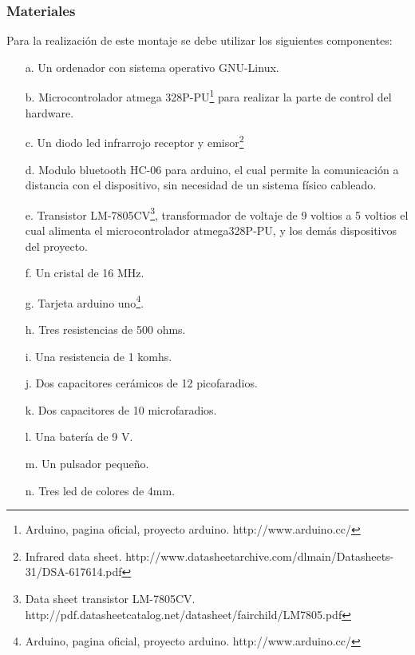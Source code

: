 \documentclass[12pt]{article}
\begin{document}
\begin{multicols}{2}
\subsubsection{Materiales}
Para la realización de este montaje se debe utilizar los siguientes componentes:
\begin{enumerate}
\item[a.] Un ordenador con sistema operativo GNU-Linux.
\item[b.] Microcontrolador atmega 328P-PU\footnote{ Arduino, pagina oficial, proyecto arduino. http://www.arduino.cc/} para realizar la parte de control del hardware.
\item[c.] Un diodo led infrarrojo receptor y emisor\footnote{ Infrared data sheet.  http://www.datasheetarchive.com/dlmain/Datasheets-31/DSA-617614.pdf}
\item[d.] Modulo bluetooth HC-06 para arduino, el cual permite la comunicación a distancia con el dispositivo, sin necesidad de un sistema físico cableado.
\item[e.] Transistor LM-7805CV\footnote{ Data sheet transistor LM-7805CV. http://pdf.datasheetcatalog.net/datasheet/fairchild/LM7805.pdf}, transformador de voltaje de 9 voltios a 5 voltios el cual alimenta el microcontrolador atmega328P-PU, y los demás dispositivos del proyecto.
\item[f.] Un cristal de 16 MHz.
\item[g.] Tarjeta arduino uno\footnote{ Arduino, pagina oficial, proyecto arduino. http://www.arduino.cc/}.
\item[h.] Tres resistencias de 500 ohms.
\item[i.] Una resistencia de 1 komhs.
\item[j.] Dos capacitores cerámicos de 12 picofaradios.
\item[k.] Dos capacitores de 10 microfaradios.
\item[l.] Una batería de 9 V.
\item[m.] Un pulsador pequeño.
\item[n.] Tres led de colores de 4mm. 
\end{enumerate}


\end{multicols}
\end{document}
